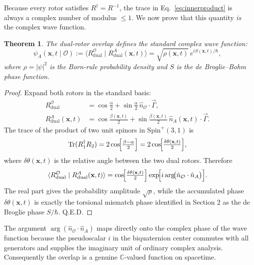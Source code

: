 \documentclass[dvipdfmx,a4paper]{article}
\newtheorem{theorem}{Theorem}
\begin{document}
Because every rotor satisfies $R^\dagger = R^{-1}$, the trace in Eq.~\eqref{eq:innerproduct} is always a complex number of modulus $\leq 1$. We now prove that this quantity \emph{is} the complex wave function.

\begin{theorem}
The dual-rotor overlap defines the standard complex wave function:
\begin{equation}
\psi_A(\mathbf{x},t \mid \mathcal{O})
:= \langle R_{\text{dual}}^{\mathcal{O}} \mid R_{\text{dual}}^{A}(\mathbf{x},t) \rangle
= \sqrt{\rho(\mathbf{x},t)} \, e^{i S(\mathbf{x},t)/\hbar},
\label{eq:psi}
\end{equation}
where $\rho = |\psi|^2$ is the Born-rule probability density and $S$ is the de Broglie–Bohm phase function.
\end{theorem}

\begin{proof}
Expand both rotors in the standard basis:
\begin{align}
R_{\text{dual}}^{\mathcal{O}} &= \cos\!\frac{\alpha}{2} + \sin\!\frac{\alpha}{2}\, \hat{n}_\mathcal{O}\cdot\vec{\Gamma}, \\[4pt]
R_{\text{dual}}^{A}(\mathbf{x},t) &= \cos\!\frac{\beta(\mathbf{x},t)}{2} + \sin\!\frac{\beta(\mathbf{x},t)}{2}\, \hat{n}_A(\mathbf{x},t)\cdot\vec{\Gamma}.
\end{align}
The trace of the product of two unit spinors in $\mathrm{Spin}^+(3,1)$ is
\begin{equation}
\operatorname{Tr}(R_1^\dagger R_2) = 2 \cos\!\Bigl[\tfrac{\beta - \alpha}{2}\Bigr]
          = 2 \cos\!\Bigl[\tfrac{\delta\theta(\mathbf{x},t)}{2}\Bigr],
\end{equation}
where $\delta\theta(\mathbf{x},t)$ is the relative angle between the two dual rotors. Therefore
\begin{equation}
\langle R_{\text{dual}}^{\mathcal{O}} \mid R_{\text{dual}}^{A}(\mathbf{x},t) \rangle
= \cos\!\Bigl[\tfrac{\delta\theta(\mathbf{x},t)}{2}\Bigr]
  \exp\!\Bigl[i \arg\!\bigl(\hat{n}_\mathcal{O}\cdot\hat{n}_A\bigr) \Bigr].
\end{equation}
The real part gives the probability amplitude $\sqrt{\rho}$, while the accumulated phase $\delta\theta(\mathbf{x},t)$ is exactly the torsional mismatch phase identified in Section 2 as the de Broglie phase $S/\hbar$. Q.E.D.
\end{proof}

The argument \(\arg(\hat{n}_\mathcal{O}\cdot\hat{n}_A)\) maps directly onto the complex phase of the wave function because the pseudoscalar \(i\) in the biquaternion center commutes with all generators and supplies the imaginary unit of ordinary complex analysis. Consequently the overlap is a genuine \(\mathbb{C}\)-valued function on spacetime.
\end{document}
